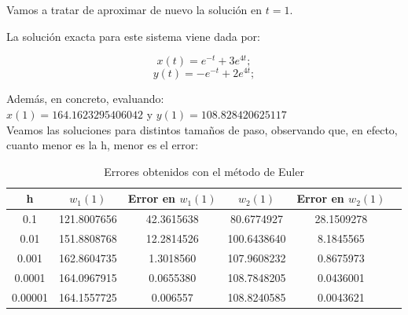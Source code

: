 \documentclass[12pt]{article}       %
\begin{document}
Vamos a tratar de aproximar de nuevo la solución en $t=1$.%

La solución exacta para este sistema viene dada por:

$$
x(t)=e^{-t}+3e^{4t};
$$
$$
y(t)= -e^{-t}+2e^{4t};
$$

Además, en concreto, evaluando:\\

$x(1)= 164.1623295406042$ y $y(1)=108.828420625117$\\

Veamos las soluciones para distintos tamaños de paso, observando que, en efecto, cuanto menor es la h, menor es el error:

    \begin{table}[H]
        \centering
        \setlength\extrarowheight{2.5pt}
        
        \begin{tabular}{|c|c|c|c|c|c}
            \hline
            \textbf{h} & {\textbf{$w_1(1)$}} & \textbf{Error en $w_1(1)$} & {\textbf{$w_2(1)$}} & \textbf{Error en $w_2(1)$} \\ 
            \hline
                0.1 & 121.8007656 & 42.3615638 & 80.6774927 & 28.1509278\\
            \hline
                0.01 & 151.8808768 & 12.2814526 & 100.6438640 & 8.1845565\\
            \hline
                0.001 & 162.8604735 & 1.3018560 & 107.9608232 & 0.8675973\\
            \hline
                0.0001 & 164.0967915 & 0.0655380 & 108.7848205 & 0.0436001\\
            \hline
                0.00001 & 164.1557725 & 0.006557 &  108.8240585 & 0.0043621\\
            \hline
        \end{tabular}
        
        \caption{Errores obtenidos con el método de Euler}           
    \end{table}
    
\end{document}
